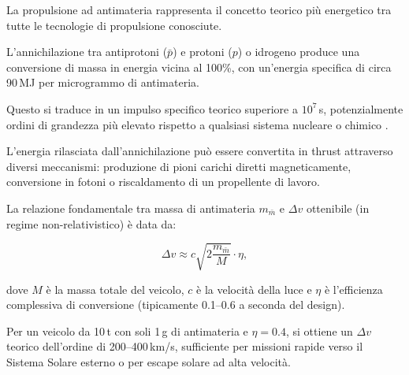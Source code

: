\documentclass[11pt,a4paper]{article}
\let\oldcite\cite
\renewcommand{\cite}{\protect\oldcite}
\theoremstyle{plain}
\theoremstyle{definition}
\begin{document}
\vspace{0.2cm}

La propulsione ad antimateria rappresenta il concetto teorico più energetico tra tutte le tecnologie di propulsione conosciute. 

\vspace{0.3cm}


L’annichilazione tra antiprotoni ($\bar{p}$) e protoni ($p$) o idrogeno produce una conversione di massa in energia vicina al 100\%, con un’energia specifica di circa 90\,MJ per microgrammo di antimateria. 


\vspace{0.2cm}


Questo si traduce in un impulso specifico teorico superiore a $10^7$\,s, potenzialmente ordini di grandezza più elevato rispetto a qualsiasi sistema nucleare o chimico \cite{forward_1985, long_2012, antoniadis_2023}.


\vspace{0.4cm}

L’energia rilasciata dall’annichilazione può essere convertita in thrust attraverso diversi meccanismi: produzione di pioni carichi diretti magneticamente, conversione in fotoni o riscaldamento di un propellente di lavoro. 


\vspace{0.3cm}

La relazione fondamentale tra massa di antimateria $m_{\bar{m}}$ e $\Delta v$ ottenibile (in regime non-relativistico) è data da:


\vspace{0.2cm}
\begin{equation}
\Delta v \approx c \sqrt{2 \frac{m_{\bar{m}}}{M}} \cdot \eta,
\label{eq:antimatter_dv}
\end{equation}


\vspace{0.3cm}
dove $M$ è la massa totale del veicolo, $c$ è la velocità della luce e $\eta$ è l’efficienza complessiva di conversione (tipicamente 0.1--0.6 a seconda del design). 

\vspace{0.3cm}

Per un veicolo da 10\,t con soli 1\,\textmu g di antimateria e $\eta = 0.4$, si ottiene un $\Delta v$ teorico dell’ordine di 200--400\,km/s, sufficiente per missioni rapide verso il Sistema Solare esterno o per escape solare ad alta velocità.

\vspace{0.3cm}
\end{document}

